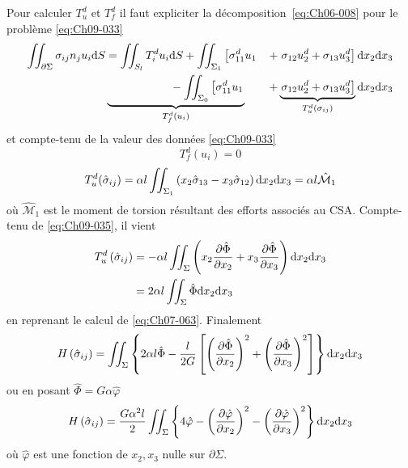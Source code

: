 Pour calculer $T_u^d$ et $T_f^d$ il faut expliciter la décomposition~\eqref{eq:Ch06-008} pour le problème \eqref{eq:Ch09-033} 
\begin{equation*}
    \begin{aligned}
        \iint_{\partial \Sigma} \sigma_{ij} n_j u_i \ud S &= \iint_{S_l} T_i^d u_i \ud S + \iint_{\Sigma_1} \left[ \sigma_{11}^d u_1 \right. &+ \left. \sigma_{12} u_2^d + \sigma_{13} u_3^d \right] \ud x_2 \ud x_3 \\
        & \underbrace{\phantom{\iint_{S_l} T_i^d u_i \ud S} -\iint_{\Sigma_0} \left[ \sigma_{11}^d u_1 \right.}_{T_f^d (u_i)} &+\underbrace{\left. \sigma_{12} u_2^d + \sigma_{13} u_3^d \right]}_{T_u^d (\sigma_{ij})} \ud x_2 \ud x_3
    \end{aligned}
\end{equation*}
et compte-tenu de la valeur des données \eqref{eq:Ch09-033} 
\begin{equation}
    T_f^d (u_i) = 0
    \label{eq:Ch09-038}
\end{equation}
\begin{equation}
    T_u^d (\hat{\sigma}_{ij}) = \alpha l  \iint_{\Sigma_1} \left( x_2 \hat{\sigma}_{13} - x_3 \hat{\sigma}_{12} \right) \mathrm{d} x_2 \mathrm{d} x_3 = \alpha l \hat{\mathcal{M}}_1
    \label{eq:Ch09-039}
\end{equation}
où $\hat{\mathcal{M}}_1$ est le moment de torsion résultant des efforts associés au CSA.
Compte-tenu de \eqref{eq:Ch09-035}, il vient 
\begin{align*}
    T_u^d \left( \hat{\sigma}_{ij} \right) &= - \alpha l \iint_{\Sigma} \left( x_2 \frac{\partial \hat{\Phi}}{\partial x_2} + x_3 \frac{\partial \hat{\Phi}}{\partial x_3} \right) \mathrm{d} x_2 \mathrm{d} x_3 \\
    &= 2 \alpha l \iint_{\Sigma} \hat{\Phi} \mathrm{d} x_2 \mathrm{d} x_3
\end{align*}
en reprenant le calcul de \eqref{eq:Ch07-063}.
Finalement 
\begin{equation}
    H \left( \hat{\sigma}_{ij} \right) = \iint_{\Sigma} \left\{ 2 \alpha l \hat{\Phi} - \frac{l}{2G} \left[ \left( \frac{\partial \hat{\Phi}}{\partial x_2} \right)^2 + \left( \frac{\partial \hat{\Phi}}{\partial x_3} \right)^2 \right] \right\} \mathrm{d} x_2 \mathrm{d} x_3
    \label{eq:Ch09-040}
\end{equation}
ou en posant $\hat{\Phi} = G \alpha \hat{\varphi}$
\begin{equation}
    H \left( \hat{\sigma}_{ij} \right) = \frac{G\alpha^2 l}{2} \iint_{\Sigma} \left\{ 4 \hat{\varphi} - \left( \frac{\partial \hat{\varphi}}{\partial x_2} \right)^2 - \left( \frac{\partial \hat{\varphi}}{\partial x_3} \right)^2 \right\} \mathrm{d} x_2 \mathrm{d} x_3
    \label{eq:Ch09-041}
\end{equation}
où $\hat{\varphi}$ est une fonction de $x_2,x_3$ nulle sur $\partial \Sigma$.

